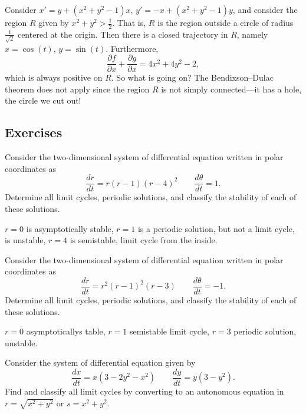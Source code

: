 \begin{example}
Consider
$x' = y+(x^2+y^2-1)x$, 
$y' = -x +(x^2+y^2-1)y$, and consider the region $R$ given by $x^2+y^2 >
\frac{1}{2}$.  That is, $R$ is the region outside a circle of radius
$\frac{1}{\sqrt{2}}$ centered at the origin.  Then
there is a closed trajectory in $R$, namely $x=\cos(t)$, $y=\sin(t)$.
Furthermore,
\begin{equation*}
\frac{\partial f}{\partial x} + 
\frac{\partial g}{\partial x} = 4x^2+4y^2-2 ,
\end{equation*}
which is always positive on $R$.  So what is going on?  The Bendixson--Dulac theorem does not
apply since the region $R$ is not simply connected---it has a hole, the
circle we cut out!
\end{example}


\subsection{Exercises}

\begin{exercise}
Consider the two-dimensional system of differential equation written in polar coordinates as
\[ \frac{dr}{dt} = r(r-1)(r-4)^2 \qquad \frac{d\theta}{dt} = 1. \] Determine all limit cycles, periodic solutions, and classify the stability of each of these solutions. 
\end{exercise}
\comboSol{%
}
{%
$r=0$ is asymptotically stable, $r=1$ is a periodic solution, but not a limit cycle, is unstable, $r=4$ is semistable, limit cycle from the inside.
}

\begin{exercise}
Consider the two-dimensional system of differential equation written in polar coordinates as
\[ \frac{dr}{dt} = r^2(r-1)^2(r-3) \qquad \frac{d\theta}{dt} = -1. \] Determine all limit cycles, periodic solutions, and classify the stability of each of these solutions. 
\end{exercise}
\comboSol{%
}
{%
$r=0$ asymptoticallys table, $r=1$ semistable limit cycle, $r=3$ periodic solution, unstable.
}

\begin{exercise}\ansMark%
Consider the system of differential equation given by
\[ \frac{dx}{dt} = x(3- 2y^2 - x^2) \qquad \frac{dy}{dt} = y(3-y^2) .\]
Find and classify all limit cycles by converting to an autonomous equation in $r = \sqrt{x^2 + y^2}$ or $s = x^2 + y^2$. 
\end{exercise}

